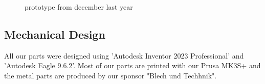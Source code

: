 \documentclass{scrartcl}
\begin{document}
\begin{figure}[!h]
    \begin{center}
    \caption{prototype from december last year}
    \label{prototype}
    \end{center}
    \end{figure}

\subsection{Mechanical Design}
All our parts were designed using 'Autodesk Inventor 2023 Professional' and 'Autodesk Eagle 9.6.2'.
Most of our parts are printed with our Prusa MK3S+ and the metal parts are produced
by our sponsor "Blech und Techhnik".
\end{document}
